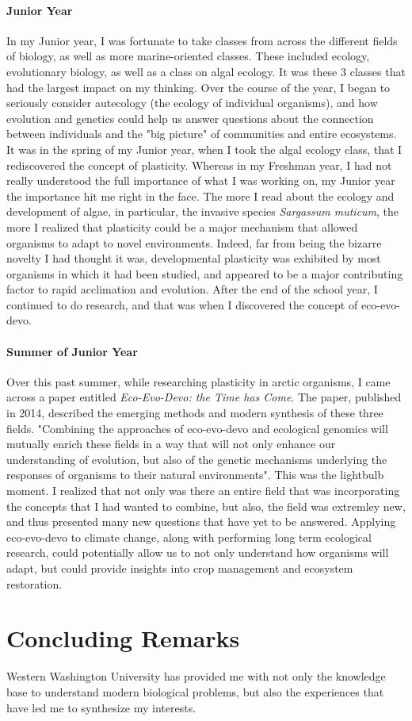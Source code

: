 \documentclass[letterpaper]{article}
\begin{document}
\paragraph{Junior Year}
In my Junior year, I was fortunate to take classes from across the different fields of biology, as well as more marine-oriented classes. These included ecology, evolutionary biology,
as well as a class on algal ecology. It was these 3 classes that had the largest impact on my thinking. 
Over the course of the year, I began to seriously consider autecology (the ecology of individual organisms), and how evolution and genetics could help us answer questions about the connection between individuals and the "big picture" of communities and 
entire ecosystems. It was in the spring of my Junior year, when I took the algal ecology class, that I rediscovered the concept of plasticity. Whereas in my Freshman year,
I had not really understood the full importance of what I was working on,  my Junior year the importance hit me right in the face. The more I read about the ecology and development of algae, in particular, the invasive species
\textit{Sargassum muticum}, the more I realized that plasticity could be a major mechanism that allowed organisms to adapt to novel environments. Indeed, far from being the bizarre novelty I had thought it was, developmental plasticity was exhibited by most organisms in which it had been studied,
and appeared to be a major contributing factor to rapid acclimation and evolution. After the end of the school year, I continued to do research, and that was when I discovered the concept of eco-evo-devo.
\paragraph{Summer of Junior Year}
Over this past summer, while researching plasticity in arctic organisms, I came across a paper entitled \textit{Eco-Evo-Devo: the Time has Come}. The paper, published in 2014, described the emerging methods and modern synthesis of these three fields.
 "Combining the approaches of eco-evo-devo and ecological genomics will mutually enrich these fields in a way that will not only enhance our understanding of evolution, but also of the genetic mechanisms underlying the responses of organisms to their 
 natural environments". 
This was the lightbulb moment. I realized that not only was there an entire field that was incorporating the concepts that I had wanted to combine, but also, the field was extremley new, and thus presented many new questions that
have yet to be answered. Applying eco-evo-devo to climate change, along with performing long term ecological research, could potentially allow us to not only understand how organisms will adapt, but could provide insights into crop management and ecosystem restoration.

\section*{Concluding Remarks}
Western Washington University has provided me with not only the knowledge base to understand modern biological problems, but also the experiences that have led me to synthesize my interests.  
\end{document}
